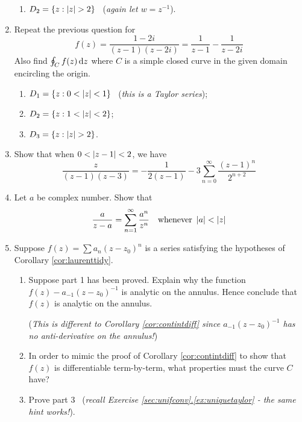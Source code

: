 \begin{exercises*}
\begin{enumerate}
\begin{enumerate}
		\item $D_2=\{z:\nm z>2\}$ \ (\emph{again let $w=z^{-1}$}).
	\end{enumerate}
	
	\item Repeat the previous question for
  \[f(z)=\frac{1-2i}{(z-1)(z-2i)}=\frac 1{z-1}-\frac 1{z-2i}\]
  Also find $\oint_Cf(z)\,{\mathrm{d} z}$ where $C$ is a simple closed curve in the given domain encircling the origin.
  \begin{enumerate}
    \item $D_1=\{z:0<\left| z\right|<1\}$ \ (\emph{this is a Taylor series});
    
    \item $D_2=\{z:1<\left| z\right|<2\}$;
		
		\item $D_3=\{z:\nm z>2\}$.
	\end{enumerate}

	\item Show that when $0<\left| z-1\right|<2$,  we have
	\[\frac z{(z-1)(z-3)}=-\frac 1{2(z-1)}-3\sum_{n=0}^\infty\frac{(z-1)^n}{2^{n+2}}\]
	
	\item Let $a$ be complex number. Show that
	\[\frac a{z-a}=\sum_{n=1}^\infty\frac{a^n}{z^n}\quad\text{whenever }\left| a\right|<\left| z\right|\]
	
  \item Suppose $f(z)=\sum a_n(z-z_0)^n$ is a series satisfying the hypotheses of Corollary \ref{cor:laurenttidy}.
  \begin{enumerate}
    \item Suppose part 1 has been proved. Explain why the function $f(z)-a_{-1}(z-z_0)^{-1}$ is analytic on the annulus. Hence conclude that $f(z)$ is analytic on the annulus.\par
    (\emph{This is different to Corollary \ref{cor:contintdiff} since $a_{-1}(z-z_0)^{-1}$ has no anti-derivative on the annulus!})
    \item In order to mimic the proof of Corollary \ref{cor:contintdiff} to show that $f(z)$ is differentiable term-by-term, what properties must the curve $C$ have?
    \item Prove part 3 \ (\emph{recall Exercise \hyperref[ex:uniquetaylor]{\ref*{sec:unifconv}.\ref*{ex:uniquetaylor}} - the same hint works!}).
	\end{enumerate}
\end{enumerate}
\end{exercises*}

